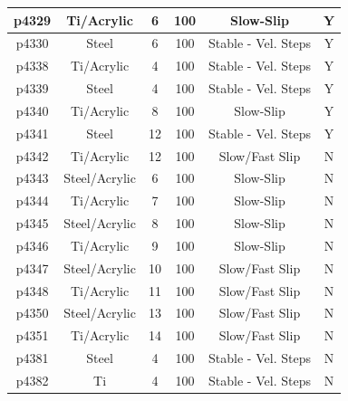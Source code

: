 \begin{landscape}
\begin{longtable}{ |c|c|c|c|c|c| }
    \hline
    p4329 & Ti/Acrylic & 6 & 100 & Slow-Slip & Y\\
    \hline
    p4330 & Steel & 6 & 100 & Stable - Vel. Steps & Y\\
    \hline
    p4338 & Ti/Acrylic & 4 & 100 & Stable - Vel. Steps & Y\\
    \hline
    p4339 & Steel & 4 & 100 & Stable - Vel. Steps & Y\\
    \hline
    p4340 & Ti/Acrylic & 8 & 100 & Slow-Slip & Y\\
    \hline
    p4341 & Steel & 12 & 100 & Stable - Vel. Steps & Y\\
    \hline
    p4342 & Ti/Acrylic & 12 & 100 & Slow/Fast Slip & N\\
    \hline
    p4343 & Steel/Acrylic & 6 & 100 & Slow-Slip & N\\
    \hline
    p4344 & Ti/Acrylic & 7 & 100 & Slow-Slip & N\\
    \hline
    p4345 & Steel/Acrylic & 8 & 100 & Slow-Slip & N\\
    \hline
    p4346 & Ti/Acrylic & 9 & 100 & Slow-Slip & N\\
    \hline
    p4347 & Steel/Acrylic & 10 & 100 & Slow/Fast Slip & N\\
    \hline
    p4348 & Ti/Acrylic & 11 & 100 & Slow/Fast Slip & N\\
    \hline
    p4350 & Steel/Acrylic & 13 & 100 & Slow/Fast Slip & N\\
    \hline
    p4351 & Ti/Acrylic & 14 & 100 & Slow/Fast Slip & N\\
    \hline
    p4381 & Steel & 4 & 100 & Stable - Vel. Steps & N\\
    \hline
    p4382 & Ti & 4 & 100 & Stable - Vel. Steps & N\\
    \hline
\end{longtable}
\end{landscape}
